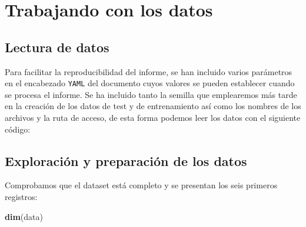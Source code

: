 \documentclass[
]{article}
\newenvironment{Shaded}{\begin{snugshade}}{\end{snugshade}}
\newcommand{\CommentTok}[1]{\textcolor[rgb]{0.56,0.35,0.01}{\textit{#1}}}
\newcommand{\DataTypeTok}[1]{\textcolor[rgb]{0.13,0.29,0.53}{#1}}
\newcommand{\KeywordTok}[1]{\textcolor[rgb]{0.13,0.29,0.53}{\textbf{#1}}}
\newcommand{\NormalTok}[1]{#1}
\newcommand{\OperatorTok}[1]{\textcolor[rgb]{0.81,0.36,0.00}{\textbf{#1}}}
\newcommand{\StringTok}[1]{\textcolor[rgb]{0.31,0.60,0.02}{#1}}
\begin{document}
\hypertarget{trabajando-con-los-datos}{%
\section{Trabajando con los datos}\label{trabajando-con-los-datos}}

\hypertarget{lectura-de-datos}{%
\subsection{Lectura de datos}\label{lectura-de-datos}}

Para facilitar la reproducibilidad del informe, se han incluido varios
parámetros en el encabezado \texttt{YAML} del documento cuyos valores se
pueden establecer cuando se procesa el informe. Se ha incluido tanto la
semilla que emplearemos más tarde en la creación de los datos de test y
de entrenamiento así como los nombres de los archivos y la ruta de
acceso, de esta forma podemos leer los datos con el siguiente código:

\begin{Shaded}
\end{Shaded}

\hypertarget{exploraciuxf3n-y-preparaciuxf3n-de-los-datos}{%
\subsection{Exploración y preparación de los
datos}\label{exploraciuxf3n-y-preparaciuxf3n-de-los-datos}}

Comprobamos que el dataset está completo y se presentan los seis
primeros registros:

\begin{Shaded}
\begin{Highlighting}[]
\KeywordTok{dim}\NormalTok{(data)}
\end{Highlighting}
\end{Shaded}
\end{document}
